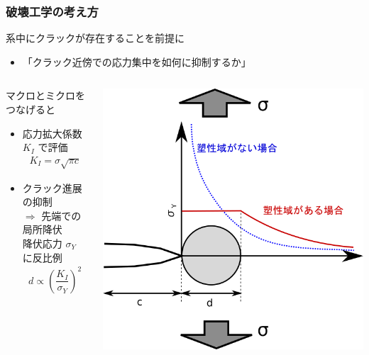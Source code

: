 \documentclass[1４pt, dvipdfmx]{beamer}
\begin{document}
\begin{frame}
\frametitle{破壊工学の考え方}
\begin{exampleblock}{系中にクラックが存在することを前提に}

\begin{itemize}
\item
\alert{「クラック近傍での応力集中を如何に抑制するか」}
\end{itemize}
\end{exampleblock}

\begin{columns}[totalwidth=1\textwidth]
\begin{alertblock}{マクロとミクロをつなげると}
	\begin{itemize}
		\item
		\alert{応力拡大係数 $K_I$ で評価}
		\footnotesize
		\begin{align*}
		K_{I} = \sigma \sqrt{\pi c}
		\end{align*}
		\normalsize
		\item 
		クラック進展の抑制 \\
		$\Rightarrow$ 先端での\alert{局所降伏}\\
		降伏応力 $\sigma_Y$ に反比例
		\footnotesize
		\begin{align*}
		d \propto \left( \dfrac{K_I}{\sigma_Y} \right)^2
		\end{align*}
		\normalsize
	\end{itemize}
\end{alertblock}
	\centering
	\includegraphics[width=.9\textwidth]{yeild_crack.png}
\end{columns}
\end{frame}
\end{document}
